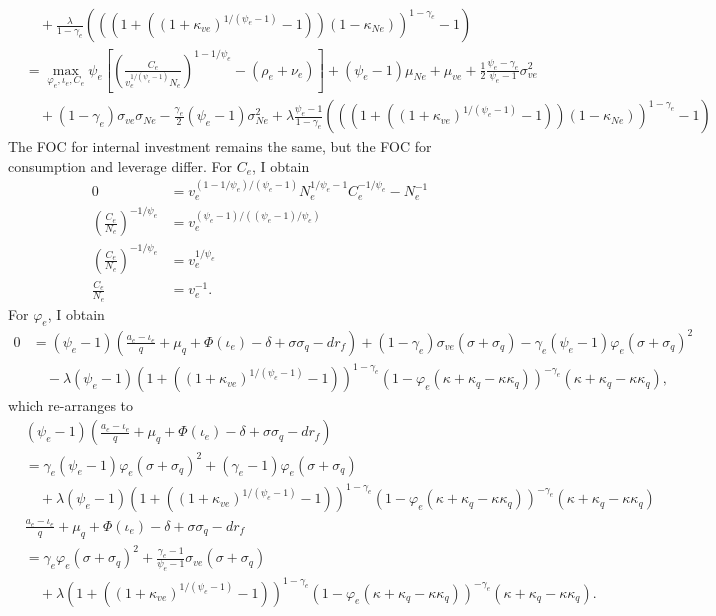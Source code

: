 \documentclass[12 pt, oneside]{article}
\theoremstyle{definition}
\theoremstyle{definition}
\theoremstyle{definition}
\begin{document}
\begin{align*}
                                          &\quad + \frac{\lambda}{1 - \gamma_e}(((1 +  ((1 + \kappa_{ve})^{1 / (\psi_e - 1)} - 1))(1 - \kappa_{Ne}))^{1 - \gamma_e} - 1)\\
    & = \max_{\varphi_e, \iota_e, C_e} \psi_e\left[\left(\frac{C_e}{v_e^{1 / (\psi_e - 1)}N_e  }\right)^{1 - 1 / \psi_e} - (\rho_e + \nu_e)\right]+  (\psi_e - 1)\mu_{Ne} + \mu_{ve} + \frac{1}{2}\frac{\psi_e - \gamma_e}{\psi_e - 1}\sigma_{ve}^2 \\
& \quad   + (1 - \gamma_e)\sigma_{ve}\sigma_{Ne} - \frac{\gamma_e}{2}(\psi_e - 1) \sigma_{Ne}^2  + \lambda\frac{\psi_e - 1}{1 - \gamma_e}(((1 +  ((1 + \kappa_{ve})^{1 / (\psi_e - 1)} - 1))(1 - \kappa_{Ne}))^{1 - \gamma_e} - 1)
\end{align*}%
The FOC for internal investment remains the same, but the FOC for consumption and leverage differ. For $C_e$, I obtain
\begin{align*}
 0 & =   v_e^{(1 - 1/\psi_e) / (\psi_e - 1)}N_e^{1 / \psi_e - 1} C_e^{ - 1/ \psi_e} -N_e^{-1}\\
  \left(\frac{C_e}{N_e}\right)^{-1/\psi_e} & = v_e^{(\psi_e - 1) / ((\psi_e - 1) / \psi_e)}\\
  \left(\frac{C_e}{N_e}\right)^{-1/\psi_e} & = v_e^{1 / \psi_e}\\
  \frac{C_e}{N_e} & = v_e^{-1}.
\end{align*}
For $\varphi_e$, I obtain
\begin{align*}
  0 & = (\psi_e - 1)\left(\frac{a_e - \iota_e}{q} + \mu_q + \Phi(\iota_e) - \delta + \sigma\sigma_q - dr_f\right) + (1 - \gamma_e)\sigma_{ve}(\sigma + \sigma_q) - \gamma_e(\psi_e - 1)\varphi_e(\sigma + \sigma_q)^2 \\
    &\quad - \lambda(\psi_e - 1)(1 + ((1 + \kappa_{ve})^{1 / (\psi_e - 1)} - 1 ))^{1 - \gamma_e}(1 - \varphi_e(\kappa + \kappa_q - \kappa\kappa_q))^{ - \gamma_e}(\kappa + \kappa_q - \kappa\kappa_q),
\end{align*}
which re-arranges to
\begin{align*}
& (\psi_e - 1)\left(\frac{a_e - \iota_e}{q} + \mu_q + \Phi(\iota_e) - \delta + \sigma\sigma_q - dr_f\right)\\
& = \gamma_e(\psi_e - 1)\varphi_e(\sigma + \sigma_q)^2 + (\gamma_e - 1)\varphi_e(\sigma + \sigma_q)\\
&\quad + \lambda(\psi_e - 1)(1 + ((1 + \kappa_{ve})^{1 / (\psi_e - 1)} - 1))^{1 - \gamma_e}(1 - \varphi_e(\kappa + \kappa_q - \kappa\kappa_q))^{ - \gamma_e}(\kappa + \kappa_q - \kappa\kappa_q)\\
& \frac{a_e - \iota_e}{q} + \mu_q + \Phi(\iota_e) - \delta + \sigma\sigma_q - dr_f\\
& = \gamma_e\varphi_e(\sigma + \sigma_q)^2 + \frac{\gamma_e - 1}{\psi_e - 1}\sigma_{ve}(\sigma + \sigma_q)\\
& \quad + \lambda(1 + ((1 + \kappa_{ve})^{1 / (\psi_e - 1)} - 1))^{1 - \gamma_e}(1 - \varphi_e(\kappa + \kappa_q - \kappa\kappa_q))^{ - \gamma_e}(\kappa + \kappa_q - \kappa\kappa_q).
\end{align*}
\end{document}
